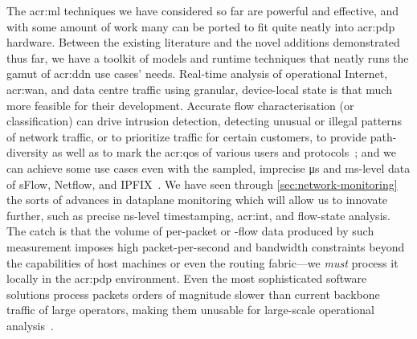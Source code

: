 %

The \gls{acr:ml} techniques we have considered so far are powerful and effective, and with some amount of work many can be ported to fit quite neatly into \gls{acr:pdp} hardware.
Between the existing literature and the novel additions demonstrated thus far, we have a toolkit of models and runtime techniques that neatly runs the gamut of \gls{acr:ddn} use cases' needs.
Real-time analysis of operational Internet, \gls{acr:wan}, and data centre traffic using granular, device-local state is that much more feasible for their development.
Accurate flow characterisation (or classification) can drive intrusion detection, detecting unusual or illegal patterns of network traffic, or to prioritize traffic for certain customers, to provide path-diversity as well as to mark the \gls{acr:qos} of various users and protocols~\parencite{DBLP:journals/ccr/BernailleTASS06,DBLP:conf/lisa/Roesch99}; and we can achieve some use cases even with the sampled, imprecise \unit{\micro\second} and \unit{\milli\second}-level data of sFlow, Netflow, and IPFIX~\parencite{rfc7011,rfc3954}.
We have seen through \cref{sec:network-monitoring} the sorts of advances in dataplane monitoring which will allow us to innovate further, such as precise \unit{\nano\second}-level timestamping, \gls{acr:int}, and flow-state analysis.
The catch is that the volume of per-packet or -flow data produced by such measurement imposes high packet-per-second and bandwidth constraints beyond the capabilities of host machines or even the routing fabric---we \emph{must} process it locally in the \gls{acr:pdp} environment.
Even the most sophisticated software solutions process packets orders of magnitude slower than current backbone traffic of large operators, making them unusable for large-scale operational analysis~\parencite{DBLP:journals/wpc/ParkA17}.

